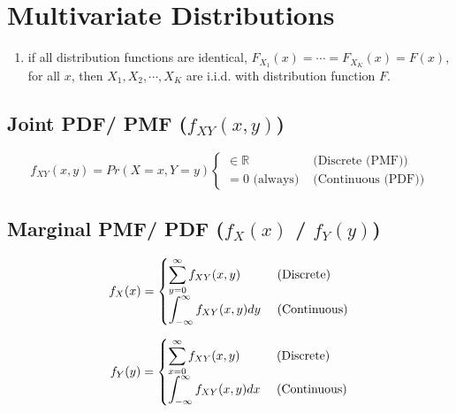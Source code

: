 \section{Multivariate Distributions \cite{ism-1,mfml-1}} \label{Multivariate Distributions}

\begin{enumerate}
     \item if all distribution functions are identical, $F_{X_1}(x)=\cdots=F_{X_K}(x)=F(x)$, for all $x$, then $X_1, X_2,\cdots,X_K$ are i.i.d. with distribution function $F$.
\end{enumerate}

\subsection{Joint PDF/ PMF ($f_{XY}(x, y)$) \cite{ism-1}}\label{Multivariate Distributions: Joint PDF/ PMF}

\[
    f_{XY}(x, y) 
    = Pr(X = x, Y = y)
    \begin{cases}
        \in \mathbb{R} & \text{ (Discrete (PMF))}\\
        = 0 \text{ (always)} & \text{ (Continuous (PDF))}
    \end{cases}
\]

\subsection{Marginal PMF/ PDF ($f_X(x)$ / $f_Y(y)$) \cite{ism-1,mfml-1}}\label{Multivariate Distributions: Marginal PMF/ PDF}

\begin{table}[H]
    \begin{minipage}{0.49\linewidth}
        \[
            f_X(x)
            = \begin{cases}
                \displaystyle\sum_{y=0}^\infty f_{XY}(x,y) & \text{ (Discrete)}\\[2ex]
                \displaystyle\int_{-\infty}^\infty f_{XY}(x,y) dy & \text{ (Continuous)}\\
            \end{cases}
        \]
    \end{minipage}
    \hfill
    \begin{minipage}{0.49\linewidth}
        \[
            f_Y(y)
            = \begin{cases}
                \displaystyle\sum_{x=0}^\infty f_{XY}(x,y) & \text{ (Discrete)}\\[2ex]
                \displaystyle\int_{-\infty}^\infty f_{XY}(x,y) dx & \text{ (Continuous)}\\
            \end{cases}
        \]
    \end{minipage}
\end{table}

